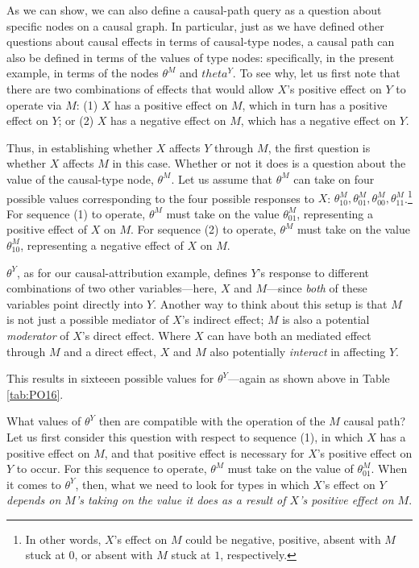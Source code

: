 \documentclass[12pt,]{book}
\let\rmarkdownfootnote\footnote%
\def\footnote{\protect\rmarkdownfootnote}
\begin{document}
As we can show, we can also define a causal-path query as a question about specific nodes on a causal graph. In particular, just as we have defined other questions about causal effects in terms of causal-type nodes, a causal path can also be defined in terms of the values of type nodes: specifically, in the present example, in terms of the nodes \(\theta^M\) and \(theta^Y\). To see why, let us first note that there are two combinations of effects that would allow \(X\)'s positive effect on \(Y\) to operate via \(M\): (1) \(X\) has a positive effect on \(M\), which in turn has a positive effect on \(Y\); or (2) \(X\) has a negative effect on \(M\), which has a negative effect on \(Y\).

Thus, in establishing whether \(X\) affects \(Y\) through \(M\), the first question is whether \(X\) affects \(M\) in this case. Whether or not it does is a question about the value of the causal-type node, \(\theta^M\). Let us assume that \(\theta^M\) can take on four possible values corresponding to the four possible responses to \(X\): \(\theta^M_{10}, \theta^M_{01}, \theta^M_{00}, \theta^M_{11}\).\footnote{In other words, \(X\)'s effect on \(M\) could be negative, positive, absent with \(M\) stuck at \(0\), or absent with \(M\) stuck at \(1\), respectively.} For sequence (1) to operate, \(\theta^M\) must take on the value \(\theta^M_{01}\), representing a positive effect of \(X\) on \(M\). For sequence (2) to operate, \(\theta^M\) must take on the value \(\theta^M_{10}\), representing a negative effect of \(X\) on \(M\).

\(\theta^Y\), as for our causal-attribution example, defines \(Y\)'s response to different combinations of two other variables---here, \(X\) and \(M\)---since \emph{both} of these variables point directly into \(Y\). Another way to think about this setup is that \(M\) is not just a possible mediator of \(X\)'s indirect effect; \(M\) is also a potential \emph{moderator} of \(X\)'s direct effect. Where \(X\) can have both an mediated effect through \(M\) and a direct effect, \(X\) and \(M\) also potentially \emph{interact} in affecting \(Y\).

This results in sixteeen possible values for \(\theta^Y\)---again as shown above in Table \ref{tab:PO16}.

What values of \(\theta^Y\)
then are compatible with the operation of the \(M\) causal path? Let us first consider this question with respect to sequence (1), in which \(X\) has a positive effect on \(M\), and that positive effect is necessary for \(X\)'s positive effect on \(Y\) to occur. For this sequence to operate, \(\theta^M\) must take on the value of \(\theta^M_{01}\). When it comes to \(\theta^Y\), then, what we need to look for types in which \(X\)'s effect on \(Y\) \emph{depends on \(M\)'s taking on the value it does as a result of \(X\)'s positive effect on \(M\)}.
\end{document}
